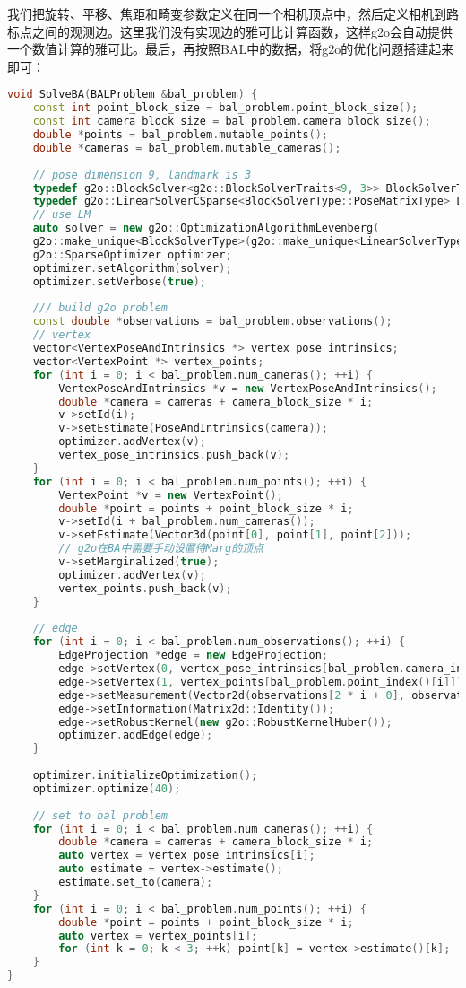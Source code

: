 我们把旋转、平移、焦距和畸变参数定义在同一个相机顶点中，然后定义相机到路标点之间的观测边。这里我们没有实现边的雅可比计算函数，这样g2o会自动提供一个数值计算的雅可比。最后，再按照BAL中的数据，将g2o的优化问题搭建起来即可：
\begin{lstlisting}[language=c++,caption=slambook2/ch9/bundle_adjustment_g2o.cpp（片段）]
void SolveBA(BALProblem &bal_problem) {
	const int point_block_size = bal_problem.point_block_size();
	const int camera_block_size = bal_problem.camera_block_size();
	double *points = bal_problem.mutable_points();
	double *cameras = bal_problem.mutable_cameras();
	
	// pose dimension 9, landmark is 3
	typedef g2o::BlockSolver<g2o::BlockSolverTraits<9, 3>> BlockSolverType;
	typedef g2o::LinearSolverCSparse<BlockSolverType::PoseMatrixType> LinearSolverType;
	// use LM
	auto solver = new g2o::OptimizationAlgorithmLevenberg(
	g2o::make_unique<BlockSolverType>(g2o::make_unique<LinearSolverType>()));
	g2o::SparseOptimizer optimizer;
	optimizer.setAlgorithm(solver);
	optimizer.setVerbose(true);
	
	/// build g2o problem
	const double *observations = bal_problem.observations();
	// vertex
	vector<VertexPoseAndIntrinsics *> vertex_pose_intrinsics;
	vector<VertexPoint *> vertex_points;
	for (int i = 0; i < bal_problem.num_cameras(); ++i) {
		VertexPoseAndIntrinsics *v = new VertexPoseAndIntrinsics();
		double *camera = cameras + camera_block_size * i;
		v->setId(i);
		v->setEstimate(PoseAndIntrinsics(camera));
		optimizer.addVertex(v);
		vertex_pose_intrinsics.push_back(v);
	}
	for (int i = 0; i < bal_problem.num_points(); ++i) {
		VertexPoint *v = new VertexPoint();
		double *point = points + point_block_size * i;
		v->setId(i + bal_problem.num_cameras());
		v->setEstimate(Vector3d(point[0], point[1], point[2]));
		// g2o在BA中需要手动设置待Marg的顶点
		v->setMarginalized(true);
		optimizer.addVertex(v);
		vertex_points.push_back(v);
	}
	
	// edge
	for (int i = 0; i < bal_problem.num_observations(); ++i) {
		EdgeProjection *edge = new EdgeProjection;
		edge->setVertex(0, vertex_pose_intrinsics[bal_problem.camera_index()[i]]);
		edge->setVertex(1, vertex_points[bal_problem.point_index()[i]]);
		edge->setMeasurement(Vector2d(observations[2 * i + 0], observations[2 * i + 1]));
		edge->setInformation(Matrix2d::Identity());
		edge->setRobustKernel(new g2o::RobustKernelHuber());
		optimizer.addEdge(edge);
	}
	
	optimizer.initializeOptimization();
	optimizer.optimize(40);
	
	// set to bal problem
	for (int i = 0; i < bal_problem.num_cameras(); ++i) {
		double *camera = cameras + camera_block_size * i;
		auto vertex = vertex_pose_intrinsics[i];
		auto estimate = vertex->estimate();
		estimate.set_to(camera);
	}
	for (int i = 0; i < bal_problem.num_points(); ++i) {
		double *point = points + point_block_size * i;
		auto vertex = vertex_points[i];
		for (int k = 0; k < 3; ++k) point[k] = vertex->estimate()[k];
	}
}
\end{lstlisting}

